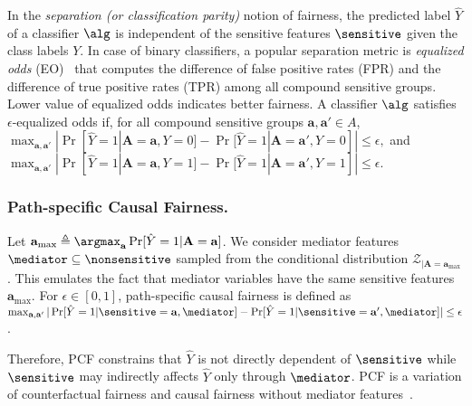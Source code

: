 		
		In the \textit{separation (or classification parity)} notion of fairness, the predicted label $\hat{Y}$ of a classifier $\alg$ is independent of the sensitive features $\sensitive$ given the class labels $Y$. In case of binary classifiers, a popular separation metric is \textit{equalized odds} (EO)~\cite{hardt2016equality} that computes the difference of false positive rates (FPR) and the difference of true positive rates (TPR) among all compound sensitive groups. 
		Lower value of equalized odds indicates better fairness.
		A classifier $\alg$ satisfies $\epsilon$-equalized odds if, for all compound sensitive groups $\mathbf{a}, \mathbf{a}' \in A$,
		$ \max_{\mathbf{a}, \mathbf{a}'} |\Pr[\hat{Y} =1 |\mathbf{A}= \mathbf{a}, Y= 0  ] - \Pr [\hat{Y} = 1|\mathbf{A}= \mathbf{a}', Y = 0]| \le \epsilon, $ and $
		\max_{\mathbf{a}, \mathbf{a}'}|\Pr[\hat{Y} =1 |\mathbf{A}= \mathbf{a}, Y= 1  ] - \Pr [\hat{Y} = 1|\mathbf{A}= \mathbf{a}', Y = 1]| \le \epsilon.
		$
		
		
		
		\subsubsection{Path-specific Causal Fairness.}
		Let $ \mathbf{a}_{\max}  \triangleq \argmax_{ \mathbf{a}} \Pr[\hat{Y} =1 |\mathbf{A}=  \mathbf{a}] $. We consider mediator features $ \mediator \subseteq \nonsensitive $ sampled from the conditional distribution $ {\mathcal{Z}_{|\mathbf{A} = \mathbf{a}_{\max}}} $. This emulates the fact that mediator variables have the same sensitive features $ \mathbf{a}_{\max} $.  For $ \epsilon \in [0,1] $,  path-specific causal fairness is defined as 
		$
		\max_{\mathbf{a}, \mathbf{a}'} |\Pr[\hat{Y} = 1 | \sensitive =  \mathbf{a}, \mediator] - \Pr[\hat{Y} = 1 | \sensitive = \mathbf{a}', \mediator ]| \le \epsilon
		$.
		
		Therefore, PCF constrains that $ \hat{Y} $ is not directly dependent of $ \sensitive $ while $ \sensitive $ may indirectly affects $ \hat{Y} $ only through $ \mediator $. PCF is a variation of counterfactual fairness and causal fairness without mediator features~\cite{bastani2019probabilistic}. 
		
		
	
